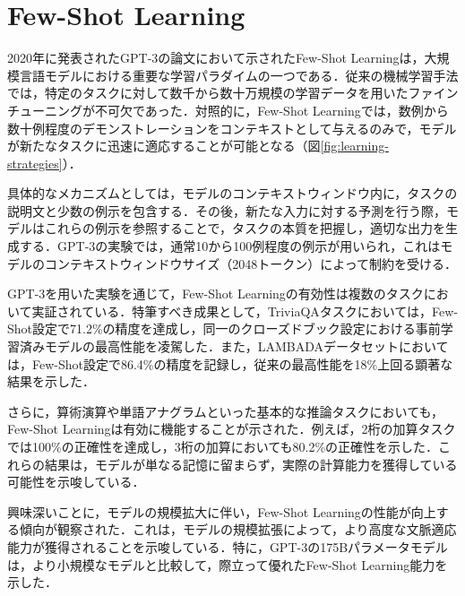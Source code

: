 \documentclass[11pt]{jreport}
\begin{document}
\section{Few-Shot Learning}
2020年に発表されたGPT-3の論文\cite{Few-shot}において示されたFew-Shot Learningは，大規模言語モデルにおける重要な学習パラダイムの一つである．従来の機械学習手法では，特定のタスクに対して数千から数十万規模の学習データを用いたファインチューニングが不可欠であった．対照的に，Few-Shot Learningでは，数例から数十例程度のデモンストレーションをコンテキストとして与えるのみで，モデルが新たなタスクに迅速に適応することが可能となる（図\ref{fig:learning-strategies}）．

具体的なメカニズムとしては，モデルのコンテキストウィンドウ内に，タスクの説明文と少数の例示を包含する．その後，新たな入力に対する予測を行う際，モデルはこれらの例示を参照することで，タスクの本質を把握し，適切な出力を生成する．GPT-3の実験では，通常10から100例程度の例示が用いられ，これはモデルのコンテキストウィンドウサイズ（2048トークン）によって制約を受ける．

GPT-3を用いた実験を通じて，Few-Shot Learningの有効性は複数のタスクにおいて実証されている．特筆すべき成果として，TriviaQAタスクにおいては，Few-Shot設定で71.2\%の精度を達成し，同一のクローズドブック設定における事前学習済みモデルの最高性能を凌駕した．また，LAMBADAデータセットにおいては，Few-Shot設定で86.4\%の精度を記録し，従来の最高性能を18\%上回る顕著な結果を示した．

さらに，算術演算や単語アナグラムといった基本的な推論タスクにおいても，Few-Shot Learningは有効に機能することが示された．例えば，2桁の加算タスクでは100\%の正確性を達成し，3桁の加算においても80.2\%の正確性を示した．これらの結果は，モデルが単なる記憶に留まらず，実際の計算能力を獲得している可能性を示唆している．

興味深いことに，モデルの規模拡大に伴い，Few-Shot Learningの性能が向上する傾向が観察された．これは，モデルの規模拡張によって，より高度な文脈適応能力が獲得されることを示唆している．特に，GPT-3の175Bパラメータモデルは，より小規模なモデルと比較して，際立って優れたFew-Shot Learning能力を示した．
\end{document}
